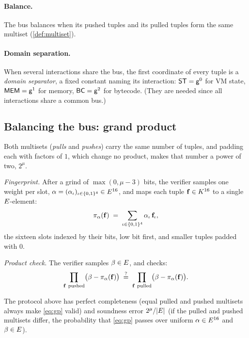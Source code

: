 \paragraph{Balance.} The bus balances when its pushed tuples and its pulled tuples form the same multiset (\ref{def:multiset}).

\paragraph{Domain separation.} When several interactions share the bus, the first coordinate of every tuple is a \emph{domain separator}, a fixed constant naming its interaction: $\mathsf{ST}=\mathsf{g}^{0}$ for VM state, $\mathsf{MEM}=\mathsf{g}^{1}$ for memory, $\mathsf{BC}=\mathsf{g}^{2}$ for bytecode. (They are needed since all interactions share a common bus.)

\subsection{Balancing the bus: grand product}\label{sec:gp}

Both multisets (\emph{pulls} and \emph{pushes}) carry the same number of tuples, and padding each with factors of $1$, which change no product, makes that number a power of two, $2^{\mu}$.

\emph{Fingerprint.} After a grind of $\max(0,\mu-3)$ bits, the verifier samples one weight per slot, $\alpha=(\alpha_\iota)_{\iota\in\{0,1\}^{4}}\in E^{16}$, and maps each tuple $\mathbf{f} \in K^{16}$ to a single $E$-element:
\[
\pi_\alpha(\mathbf{f})\;=\;\sum_{\iota\in\{0,1\}^{4}}\alpha_\iota\,\mathbf{f}_\iota ,
\]
the sixteen slots indexed by their bits, low bit first, and smaller tuples padded with $0$.

\emph{Product check.} The verifier samples $\beta\in E$, and checks:
\begin{equation}
\prod_{\btup\ \text{pushed}}\bigl(\beta-\pi_\alpha(\btup)\bigr)
\;\qeq\;
\prod_{\btup\ \text{pulled}}\bigl(\beta-\pi_\alpha(\btup)\bigr).
\label{eq:gp}
\end{equation}

\begin{theorem}\label{th:product_check}
  The protocol above has perfect completeness (equal pulled and pushed multisets always make \eqref{eq:gp} valid) and soundness error $2^{\mu}/|E|$ (if the pulled and pushed multisets differ, the probability that \eqref{eq:gp} passes over uniform $\alpha \in E^{16}$ and $\beta \in E$).
\end{theorem}

